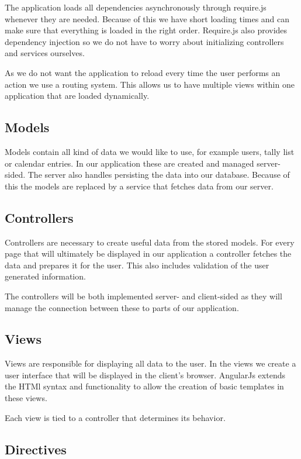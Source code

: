The application loads all dependencies asynchronously through require.js
whenever they are needed. Because of this we have short loading times
and can make sure that everything is loaded in the right order.
Require.js also provides dependency injection so we do not have to worry
about initializing controllers and services ourselves.

As we do not want the application to reload every time the user performs
an action we use a routing system. This allows us to have multiple views
within one application that are loaded dynamically.

\subsection{Models}\label{models}

Models contain all kind of data we would like to use, for example users,
tally list or calendar entries. In our application these are created and
managed server-sided. The server also handles persisting the data into
our database. Because of this the models are replaced by a service that
fetches data from our server.

\subsection{Controllers}\label{controllers}

Controllers are necessary to create useful data from the stored models.
For every page that will ultimately be displayed in our application a
controller fetches the data and prepares it for the user. This also
includes validation of the user generated information.

The controllers will be both implemented server- and client-sided as
they will manage the connection between these to parts of our
application.

\subsection{Views}\label{views}

Views are responsible for displaying all data to the user. In the views
we create a user interface that will be displayed in the client's
browser. AngularJs extends the HTMl syntax and functionality to allow
the creation of basic templates in these views.

Each view is tied to a controller that determines its behavior.

\subsection{Directives}\label{directives}

